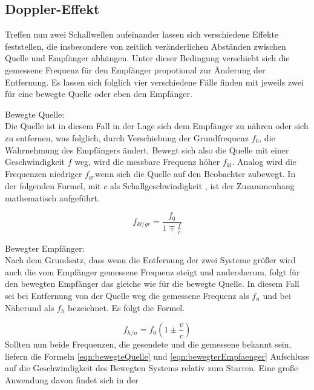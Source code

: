 \subsection{Doppler-Effekt}
Treffen nun zwei Schallwellen aufeinander lassen sich verschiedene Effekte feststellen, die insbesondere von zeitlich veränderlichen
Abständen zwischen Quelle und Empfänger abhängen. Unter dieser Bedingung verschiebt sich die gemessene Frequenz für den Empfänger 
propotional zur Änderung der Entfernung. 
Es lassen sich folglich vier verschiedene Fälle finden mit jeweils zwei für eine bewegte Quelle oder eben den Empfänger.
\begin{description}
    \item Bewegte Quelle: \\
    Die Quelle ist in diesem Fall in der Lage sich dem Empfänger zu nähren oder sich zu entfernen, was folglich, durch Verschiebung der Grundfrequenz $f_0$,
    die Wahrnehmung des Empfängers ändert. Bewegt sich also die Quelle mit einer Geschwindigkeit $f$ weg, wird die messbare Frequenz höher $f_{kl}$. Analog wird die Frequenzen
    niedriger $f_{gr}$wenn sich die Quelle auf den Beobachter zubewegt. In der folgenden Formel, mit $c$ als Schallgeschwindigkeit
    \cite{...}, ist der Zusammenhang mathematisch aufgeführt.
\end{description}
\begin{equation}
    \label{eqn:bewegteQuelle}
    f_{kl/gr} = \frac{f_0}{1 \mp \frac{f}{c}}
\end{equation}
\begin{description}
    \item Bewegter Empfänger: \\
    Nach dem Grundsatz, dass wenn die Entfernung der zwei Systeme größer wird auch die vom Empfänger gemessene Frequenz steigt und andersherum,
    folgt für den bewegten Empfänger das gleiche wie für die bewegte Quelle. In diesem Fall sei bei Entfernung von der Quelle weg die gemessene 
    Frequenz als $f_n$ und bei Näherund als $f_h$ bezeichnet. Es folgt die Formel.
\end{description}
\begin{equation}
    \label{eqn:bewegterEmpfaenger}
    f_{h/n} = f_0 \left ( 1 \pm \frac{v}{c} \right )
\end{equation}
Sollten nun beide Frequenzen, die gesendete und die gemessene bekannt sein, liefern die Formeln \eqref{eqn:bewegteQuelle} und \eqref{eqn:bewegterEmpfaenger}
Aufschluss auf die Geschwindigkeit des Bewegten Systems relativ zum Starren. Eine große Anwendung davon findet sich in der 
